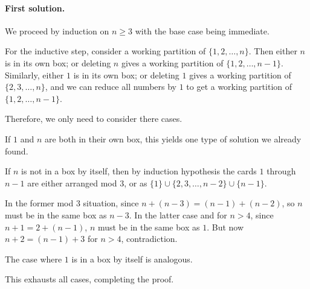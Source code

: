 \documentclass[11pt]{scrartcl}
\begin{document}
\paragraph{First solution.}
We proceed by induction on $n \ge 3$ with the base case being immediate.

For the inductive step,
consider a working partition of $\{1, 2, \dots, n\}$.
Then either $n$ is in its own box; or
deleting $n$ gives a working partition of $\{1, 2, \dots, n-1\}$.
Similarly, either $1$ is in its own box; or
deleting $1$ gives a working partition of $\{2, 3, \dots, n\}$,
and we can reduce all numbers by $1$ to get
a working partition of $\{1, 2, \dots, n-1\}$.

Therefore, we only need to consider there cases.
\begin{itemize}
  \ii If $1$ and $n$ are both in their own box,
  this yields one type of solution we already found.

  \ii If $n$ is not in a box by itself,
  then by induction hypothesis the cards $1$ through $n-1$
  are either arranged mod $3$,
  or as $\{1\} \cup \{2,3,\dots,n-2\} \cup \{n-1\}$.
  \begin{itemize}
    \ii In the former mod $3$ situation,
    since $n + (n-3) = (n-1) + (n-2)$,
    so $n$ must be in the same box as $n-3$.
    \ii In the latter case and for $n > 4$,
    since $n + 1 = 2 + (n-1)$,
    $n$ must be in the same box as $1$.
    But now $n + 2 = (n-1) + 3$ for $n > 4$, contradiction.
  \end{itemize}

  \ii The case where $1$ is in a box by itself is analogous.
\end{itemize}
This exhausts all cases, completing the proof.
\end{document}

